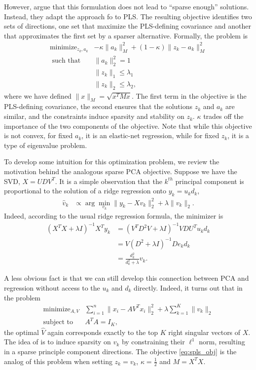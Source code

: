 \documentclass[14pt]{extarticle}
\begin{document}
However, \cite{chun2010sparse} argue that this formulation does not lead to
``sparse enough'' solutions. Instead, they adapt the approach fo
\cite{zou2006sparse} to PLS. The resulting objective identifies two sets of
directions, one set that maximize the PLS-defining covariance and another that
approximates the first set by a sparser alternative. Formally, the problem is
\begin{align}
  \label{eq:spls_obj}
  \text{minimize}_{z_k, a_k} &-\kappa \|a_k\|_M^2 + \left(1 - \kappa\right) \|z_k - a_k\|_M^2 \\
  \text{ such that } & \|a_k\|_2^2 = 1 \nonumber \\
  &\|z_k\|_1 \leq \lambda_1 \nonumber \\
  &\|z_k\|_2 \leq \lambda_2, \nonumber
\end{align}
where we have defined $\|x\|_M = \sqrt{x^T M x}$. The first term in the
objective is the PLS-defining covariance, the second ensures that the solutions
$z_k$ and $a_k$ are similar, and the constraints induce sparsity and stability
on $z_k$. $\kappa$ trades off the importance of the two components of the
objective. Note that while this objective is not convex, for fixed $a_k$, it is
an elastic-net regression, while for fixed $z_k$, it is a type of eigenvalue
problem.

To develop some intuition for this optimization problem, we review the
motivation behind the analogous sparse PCA objective. Suppose we have the SVD,
$X = UDV^T$. It is a simple observation that the $k^{th}$ principal component is
proportional to the solution of a ridge regression onto $y_k = u_k d_k$,
\begin{align*}
  \hat{v}_k &\propto \arg \min_{v_k} \|y_k - X v_k\|_2^2 + \lambda \|v_k \|_2.
\end{align*}
Indeed, according to the usual ridge regression formula, the minimizer is
\begin{align*}
  \left(X^TX + \lambda I\right)^{-1} X^T y_k &= \left(V^T D^2 V + \lambda I\right)^{-1} V D U^T u_k d_k \\
  &= V\left(D^2 + \lambda I\right)^{-1} D e_k d_k \\
  &= \frac{d_k^2}{d_k^2 + \lambda}v_k.
\end{align*}

A less obvious fact is that we can still develop this connection between PCA and
regression without access to the $u_k$ and $d_k$ directly. Indeed, it turns out
that in the problem
\begin{align}
  \label{eq:spca_obj_reform}
  \text{minimize}_{A, V} &\sum_{i = 1}^{n} \|x_i - AV^T x_i\|_2^2 +
  \lambda \sum_{k = 1}^{K} \|v_k\|_2 \\
  \text{subject to } &A^T A = I_K, \nonumber
\end{align}
the optimal $\hat{V}$ again corresponds exactly to the top $K$ right singular
vectors of $X$. The idea of \cite{zou2006sparse} is to induce sparsity on $v_k$
by constraining their $\ell^1$ norm, resulting in a sparse principle component
directions. The objective \ref{eq:spls_obj} is the analog of this problem when
setting $z_k = v_k$, $\kappa = \frac{1}{2}$ and $M = X^T X$.
\end{document}

